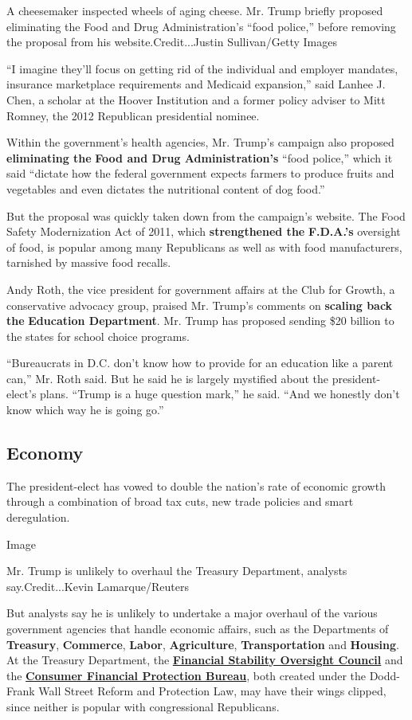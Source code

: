 A cheesemaker inspected wheels of aging cheese. Mr. Trump briefly
proposed eliminating the Food and Drug Administration's ``food police,''
before removing the proposal from his website.Credit...Justin
Sullivan/Getty Images

``I imagine they'll focus on getting rid of the individual and employer
mandates, insurance marketplace requirements and Medicaid expansion,''
said Lanhee J. Chen, a scholar at the Hoover Institution and a former
policy adviser to Mitt Romney, the 2012 Republican presidential nominee.

Within the government's health agencies, Mr. Trump's campaign also
proposed \textbf{eliminating the} \textbf{Food and Drug
Administration's} ``food police,'' which it said ``dictate how the
federal government expects farmers to produce fruits and vegetables and
even dictates the nutritional content of dog food.''

But the proposal was quickly taken down from the campaign's website. The
Food Safety Modernization Act of 2011, which \textbf{strengthened the}
\textbf{F.D.A.'s} oversight of food, is popular among many Republicans
as well as with food manufacturers, tarnished by massive food recalls.

Andy Roth, the vice president for government affairs at the Club for
Growth, a conservative advocacy group, praised Mr. Trump's comments on
\textbf{scaling back the} \textbf{Education Department}. Mr. Trump has
proposed sending \$20 billion to the states for school choice programs.

``Bureaucrats in D.C. don't know how to provide for an education like a
parent can,'' Mr. Roth said. But he said he is largely mystified about
the president-elect's plans. ``Trump is a huge question mark,'' he said.
``And we honestly don't know which way he is going go.''

\hypertarget{economy}{%
\subsection{Economy}\label{economy}}

The president-elect has vowed to double the nation's rate of economic
growth through a combination of broad tax cuts, new trade policies and
smart deregulation.

Image

Mr. Trump is unlikely to overhaul the Treasury Department, analysts
say.Credit...Kevin Lamarque/Reuters

But analysts say he is unlikely to undertake a major overhaul of the
various government agencies that handle economic affairs, such as the
Departments of \textbf{Treasury}, \textbf{Commerce}, \textbf{Labor},
\textbf{Agriculture}, \textbf{Transportation} and \textbf{Housing}. At
the Treasury Department, the
\href{https://www.treasury.gov/initiatives/fsoc/Pages/home.aspx}{\textbf{Financial
Stability Oversight Council}} and the
\href{http://www.consumerfinance.gov/}{\textbf{Consumer Financial
Protection Bureau}}, both created under the Dodd-Frank Wall Street
Reform and Protection Law, may have their wings clipped, since neither
is popular with congressional Republicans.

